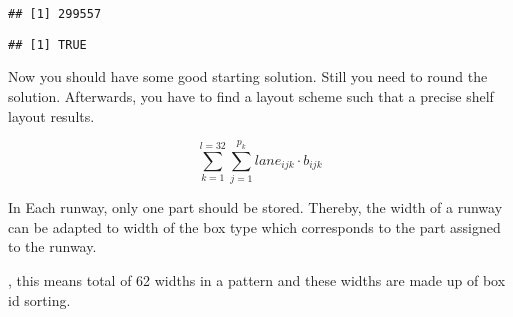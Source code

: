 \documentclass[
]{article}
\newenvironment{Shaded}{\begin{snugshade}}{\end{snugshade}}
\newcommand{\CommentTok}[1]{\textcolor[rgb]{0.56,0.35,0.01}{\textit{#1}}}
\newcommand{\DataTypeTok}[1]{\textcolor[rgb]{0.13,0.29,0.53}{#1}}
\newcommand{\KeywordTok}[1]{\textcolor[rgb]{0.13,0.29,0.53}{\textbf{#1}}}
\newcommand{\NormalTok}[1]{#1}
\newcommand{\OperatorTok}[1]{\textcolor[rgb]{0.81,0.36,0.00}{\textbf{#1}}}
\newcommand{\StringTok}[1]{\textcolor[rgb]{0.31,0.60,0.02}{#1}}
\begin{document}
\begin{Shaded}
\end{Shaded}

\begin{verbatim}
## [1] 299557
\end{verbatim}

\begin{Shaded}
\end{Shaded}

\begin{verbatim}
## [1] TRUE
\end{verbatim}

Now you should have some good starting solution. Still you need to round
the solution. Afterwards, you have to find a layout scheme such that a
precise shelf layout results.

\[\sum_{k=1}^{l=32} \sum_{j=1}^{p_k} lane_{ijk} \cdot b_{ijk} \]

In Each runway, only one part should be stored. Thereby, the width of a
runway can be adapted to width of the box type which corresponds to the
part assigned to the runway.

, this means total of 62 widths in a pattern and these widths are made
up of box id sorting.

\begin{Shaded}
\end{Shaded}
\end{document}
